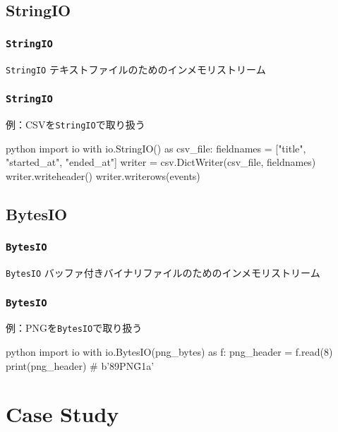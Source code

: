 \documentclass[aspectratio=169,dvipdfmx,14pt,notheorems]{beamer}
\theoremstyle{definition}
\begin{document}
\subsection{StringIO}

\begin{frame}\frametitle{\texttt{StringIO}}
\begin{block}{\texttt{StringIO}}
テキストファイルのためのインメモリストリーム
\end{block}
\end{frame}

\begin{frame}[fragile]\frametitle{\texttt{StringIO}}

\begin{exampleblock}{例：CSVを\texttt{StringIO}で取り扱う}
\begin{pygments}{python}
import io
with io.StringIO() as csv_file:
    fieldnames = ["title", "started_at", "ended_at"]
    writer = csv.DictWriter(csv_file, fieldnames)
    writer.writeheader()
    writer.writerows(events)
\end{pygments}
\end{exampleblock}

\end{frame}

\subsection{BytesIO}

\begin{frame}\frametitle{\texttt{BytesIO}}
\begin{block}{\texttt{BytesIO}}
バッファ付きバイナリファイルのためのインメモリストリーム
\end{block}
\end{frame}

\begin{frame}[fragile]\frametitle{\texttt{BytesIO}}

\begin{exampleblock}{例：PNGを\texttt{BytesIO}で取り扱う}
\begin{pygments}{python}
import io
with io.BytesIO(png_bytes) as f:
    png_header = f.read(8)
    print(png_header)  # b'\x89PNG\r\n\x1a\n'
\end{pygments}
\end{exampleblock}

\end{frame}

\section{Case Study}
\end{document}
